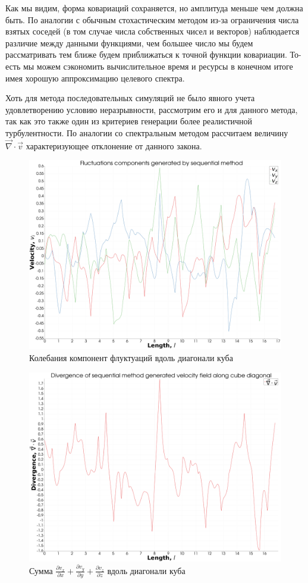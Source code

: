 Как мы видим, форма ковариаций сохраняется, но амплитуда меньше чем должна быть. По аналогии с обычным стохастическим методом из-за ограничения числа взятых соседей (в том случае числа собственных чисел и векторов) наблюдается различие между данными функциями, чем большее число мы будем рассматривать тем ближе будем приближаться к точной функции ковариации. То-есть мы можем сэкономить вычислительное время и ресурсы в конечном итоге имея хорошую аппроксимацию целевого спектра.

Хоть для метода последовательных симуляций не было явного учета удовлетворению условию неразрывности, рассмотрим его и для данного метода, так как это также один из критериев генерации более реалистичной турбулентности. По аналогии со спектральным методом рассчитаем величину $\vec \nabla \cdot \vec v$ характеризующее отклонение от данного закона. 

\begin{figure}[ht] 
    \center
    \includegraphics [width=0.8\linewidth] {images/kriging/velocity_components.png}
    \caption{Колебания компонент флуктуаций вдоль диагонали куба} 
    \label{img:sequential_method_velocity_components_along_diagonal}  
\end{figure}

\begin{figure}[ht] 
    \center
    \includegraphics [width=0.8\linewidth] {images/kriging/divergence.png}
    \caption{Сумма $\frac{\partial v_x}{\partial x} + \frac{\partial v_y}{\partial y} + \frac{\partial v_z}{\partial z}$ вдоль диагонали куба} 
    \label{img:sequential_method_velocity_field_divergence}  
\end{figure}

